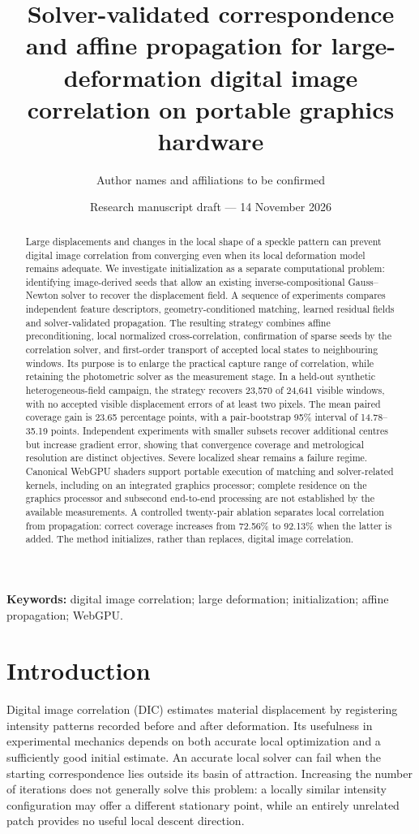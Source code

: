 \documentclass[11pt,a4paper]{article}
\title{Solver-validated correspondence and affine propagation for large-deformation digital image correlation on portable graphics hardware}
\author{Author names and affiliations to be confirmed}
\date{Research manuscript draft --- 14 November 2026}
\begin{document}
\maketitle
\begin{abstract}
Large displacements and changes in the local shape of a speckle pattern can prevent digital image correlation from converging even when its local deformation model remains adequate. We investigate initialization as a separate computational problem: identifying image-derived seeds that allow an existing inverse-compositional Gauss--Newton solver to recover the displacement field. A sequence of experiments compares independent feature descriptors, geometry-conditioned matching, learned residual fields and solver-validated propagation. The resulting strategy combines affine preconditioning, local normalized cross-correlation, confirmation of sparse seeds by the correlation solver, and first-order transport of accepted local states to neighbouring windows. Its purpose is to enlarge the practical capture range of correlation, while retaining the photometric solver as the measurement stage. In a held-out synthetic heterogeneous-field campaign, the strategy recovers 23,570 of 24,641 visible windows, with no accepted visible displacement errors of at least two pixels. The mean paired coverage gain is 23.65 percentage points, with a pair-bootstrap 95\% interval of 14.78--35.19 points. Independent experiments with smaller subsets recover additional centres but increase gradient error, showing that convergence coverage and metrological resolution are distinct objectives. Severe localized shear remains a failure regime. Canonical WebGPU shaders support portable execution of matching and solver-related kernels, including on an integrated graphics processor; complete residence on the graphics processor and subsecond end-to-end processing are not established by the available measurements. A controlled twenty-pair ablation separates local correlation from propagation: correct coverage increases from 72.56\% to 92.13\% when the latter is added. The method initializes, rather than replaces, digital image correlation.
\end{abstract}
\noindent\textbf{Keywords:} digital image correlation; large deformation; initialization; affine propagation; WebGPU.

\section{Introduction}
Digital image correlation (DIC) estimates material displacement by registering intensity patterns recorded before and after deformation. Its usefulness in experimental mechanics depends on both accurate local optimization and a sufficiently good initial estimate. An accurate local solver can fail when the starting correspondence lies outside its basin of attraction. Increasing the number of iterations does not generally solve this problem: a locally similar intensity configuration may offer a different stationary point, while an entirely unrelated patch provides no useful local descent direction.
\end{document}
